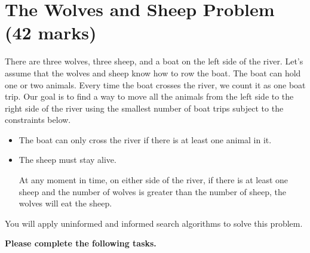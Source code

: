 \documentclass[12pt]{article}
\begin{document}
\newpage
\section{The Wolves and Sheep Problem (42 marks)}

There are three wolves, three sheep, and a boat on the left side of the river. Let's assume that the wolves and sheep know how to row the boat. The boat can hold one or two animals. Every time the boat crosses the river, we count it as one boat trip. Our goal is to find a way to move all the animals from the left side to the right side of the river using the smallest number of boat trips subject to the constraints below. 
\begin{itemize}
\item
The boat can only cross the river if there is at least one animal in it. 
\item
The sheep must stay alive. 

At any moment in time, on either side of the river, if there is at least one sheep and the number of wolves is greater than the number of sheep, the wolves will eat the sheep.
\end{itemize}

You will apply uninformed and informed search algorithms to solve this problem. 

{\bf Please complete the following tasks.}
\end{document}
